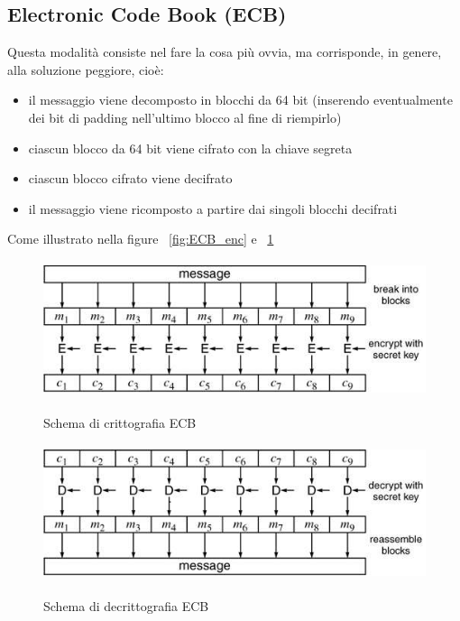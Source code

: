 \subsection{Electronic Code Book (ECB)}
Questa modalità consiste nel fare la cosa più ovvia, ma corrisponde, in genere, alla soluzione peggiore, cioè:
\begin{itemize}
\item il messaggio viene decomposto in blocchi da 64 bit (inserendo eventualmente dei bit di padding nell'ultimo blocco al fine di riempirlo)
\item ciascun blocco da 64 bit viene cifrato con la chiave segreta
\item ciascun blocco cifrato viene decifrato
\item il messaggio viene ricomposto a partire dai singoli blocchi decifrati
\end{itemize}
Come illustrato nella figure \figurename ~\ref{fig:ECB_enc} e \figurename ~\ref{fig:ECB_dec}
\begin{figure}[htbp]
	\centering%
	\subfigure%
	{\includegraphics[height=4cm, width=12cm, keepaspectratio]{Immagini/Capitolo3/ECB_enc.png}}
	\caption{Schema di crittografia ECB \label{fig:ECB_enc}} 	
	\subfigure%
	{\includegraphics[height=4cm, width=12cm, keepaspectratio]{Immagini/Capitolo3/ECB_dec.png}}
	\caption{Schema di decrittografia ECB \label{fig:ECB_dec}} 
\end{figure}
